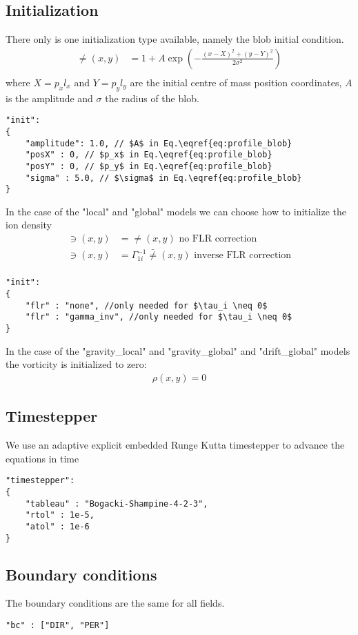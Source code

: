 \subsection{Initialization}
There only is one initialization type available, namely the blob initial condition.
\begin{align} \label{eq:profile_blob}
    \ne(x,y) &= 1 + A\exp\left( -\frac{(x-X)^2 + (y-Y)^2}{2\sigma^2}\right) \\
\end{align}
where $X = p_xl_x$ and $Y= p_yl_y$ are the initial centre of mass position coordinates, $A$ is the amplitude and $\sigma$ the
radius of the blob.
\begin{verbatim}
"init":
{
    "amplitude": 1.0, // $A$ in Eq.\eqref{eq:profile_blob}
    "posX" : 0, // $p_x$ in Eq.\eqref{eq:profile_blob}
    "posY" : 0, // $p_y$ in Eq.\eqref{eq:profile_blob}
    "sigma" : 5.0, // $\sigma$ in Eq.\eqref{eq:profile_blob}
}
\end{verbatim}
In the case of the "local" and "global" models we can choose how to initialize
the ion density
\begin{align}
    \ni(x,y) &= \ne(x,y) \text{ no FLR correction} \\
    \ni(x,y) &= \Gamma_{1i}^{-1}\bar \ne(x,y) \text{ inverse FLR correction} \\
\end{align}
\begin{verbatim}
"init":
{
    "flr" : "none", //only needed for $\tau_i \neq 0$
    "flr" : "gamma_inv", //only needed for $\tau_i \neq 0$
}
\end{verbatim}
In the case of the "gravity\_local" and "gravity\_global" and "drift\_global" models
the vorticity is initialized to zero:
\begin{align}
    \rho(x,y) = 0
\end{align}

\subsection{Timestepper}
We use an adaptive explicit embedded Runge Kutta timestepper to advance the equations in time
\begin{verbatim}
"timestepper":
{
    "tableau" : "Bogacki-Shampine-4-2-3",
    "rtol" : 1e-5,
    "atol" : 1e-6
}
\end{verbatim}
\subsection{Boundary conditions}
The boundary conditions are the same for all fields.
\begin{verbatim}
"bc" : ["DIR", "PER"]
\end{verbatim}

